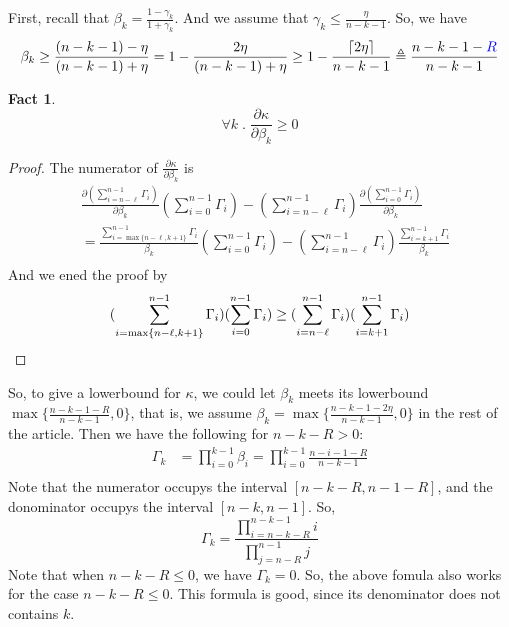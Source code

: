 \documentclass{article}
\newtheorem{fact}{Fact}[section]
\begin{document}
First, recall that $\beta_k = \frac{1 - \gamma_k}{1 + \gamma_k}$.
And we assume that $\gamma_k \leq \frac{\eta}{n - k - 1}$.
So, we have
\[\beta_k \geq \frac{(n - k - 1) - \eta}{(n - k - 1) + \eta} = 1 - \frac{2\eta}{(n - k - 1) + \eta} \geq 1 - \frac{\lceil2\eta\rceil}{n - k - 1} \triangleq \frac{n - k - 1 - \textcolor{blue}{R}}{n - k - 1}\]

\begin{fact}
  \[\forall k \;.\; \frac{\partial \kappa}{\partial \beta_k} \geq 0\]
\end{fact}
\begin{proof}
  The numerator of $\frac{\partial \kappa}{\partial \beta_k}$ is
  \begin{align*}
    &\frac{\partial (\sum_{i=n-\ell}^{n-1} \Gamma_i)}{\partial \beta_k} (\sum_{i=0}^{n-1}\Gamma_i) - (\sum_{i=n-\ell}^{n-1}\Gamma_i)\frac{\partial (\sum_{i=0}^{n-1}\Gamma_i)}{\partial \beta_k}\\
    &= \frac{\sum_{i=\max\{n-\ell,k+1\}}^{n-1} \Gamma_i}{\beta_k} (\sum_{i=0}^{n-1}\Gamma_i) - (\sum_{i=n-\ell}^{n-1}\Gamma_i)\frac{\sum_{i=k+1}^{n-1}\Gamma_i}{\beta_k}\\
  \end{align*}
  And we ened the proof by
   \[(\sum_{i=\max\{n-\ell,k+1\}}^{n-1} \Gamma_i) (\sum_{i=0}^{n-1}\Gamma_i) \geq (\sum_{i=n-\ell}^{n-1}\Gamma_i)(\sum_{i=k+1}^{n-1}\Gamma_i) \qedhere\]
\end{proof}

So, to give a lowerbound for $\kappa$, we could let $\beta_k$ meets its lowerbound $\max\{\frac{n - k - 1 - R}{n - k - 1}, 0\}$, that is, we assume $\beta_k = \max\{\frac{n - k - 1 - 2\eta}{n - k - 1}, 0\}$ in the rest of the article.
Then we have the following for $n - k - R > 0$:
\begin{align*}
  \Gamma_k
  &= \prod_{i=0}^{k-1}\beta_i  = \prod_{i=0}^{k-1}\frac{n - i - 1 - R}{n - k - 1}\\
\end{align*}
Note that the numerator occupys the interval $[n - k - R, n - 1 - R]$, and the donominator occupys the interval $[n - k, n-1]$.
So,
\[\Gamma_k = \frac{\prod_{i=n-k-R}^{n-k-1} i}{\prod_{j=n-R}^{n-1}j}\]
Note that when $n - k - R \leq 0$, we have $\Gamma_k = 0$.
So, the above fomula also works for the case $n - k - R \leq 0$.
This formula is good, since its denominator does not contains $k$.
\end{document}

